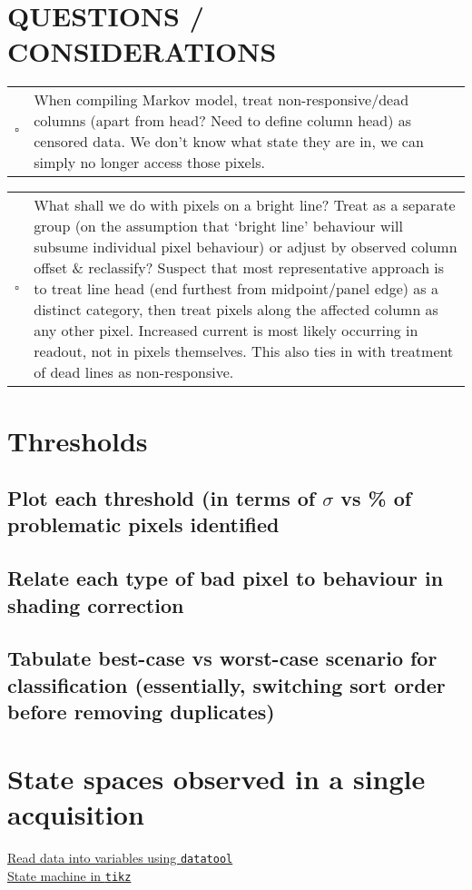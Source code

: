 \documentclass[10pt,fleqn]{article}
\newcommand{\q}[1]{
	\begin{minipage}{\textwidth}
	\textcolor{black}{
					\begin{tabular}{p{0.01\textwidth}p{0.95\textwidth}}
						$\square$ & #1
					\end{tabular}
					}
	\end{minipage}
}
\begin{document}
\section*{QUESTIONS / CONSIDERATIONS}




\q{When compiling Markov model, treat non-responsive/dead columns (apart from head? Need to define column head) as censored data. We don't know what state they are in, we can simply no longer access those pixels.}

\q{What shall we do with pixels on a bright line? Treat as a separate group (on the assumption that `bright line' behaviour will subsume individual pixel behaviour) or adjust by observed column offset \& reclassify? Suspect that most representative approach is to treat line head (end furthest from midpoint/panel edge) as a distinct category, then treat pixels along the affected column as any other pixel. Increased current is most likely occurring in readout, not in pixels themselves. This also ties in with treatment of dead lines as non-responsive.}

\newpage

\section{Thresholds}

\subsection{Plot each threshold (in terms of $\sigma$ vs \% of problematic pixels identified}

\subsection{Relate each type of bad pixel to behaviour in shading correction}

\subsection{Tabulate best-case vs worst-case scenario for classification (essentially, switching sort order before removing duplicates)}

\section{State spaces observed in a single acquisition}

\href{http://tex.stackexchange.com/questions/178904/use-datatool-to-read-a-row-from-a-csv-file-then-use-the-variables-in-the-docume}{Read data into variables using \texttt{datatool}} \\
\href{http://www.texample.net/tikz/examples/state-machine/}{State machine in \texttt{tikz}}
\end{document}
